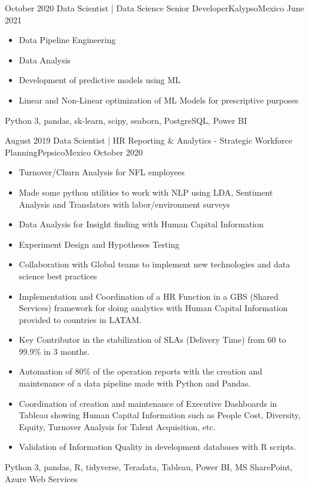 \begin{experiences}
  \experience
    {October 2020} {Data Scientist | Data Science Senior Developer}{Kalypso}{Mexico}
    {June 2021}    {
                      \begin{itemize}
                        \item Data Pipeline Engineering
                        \item Data Analysis
                        \item Development of predictive models using ML
                        \item Linear and Non-Linear optimization of ML Models for prescriptive purposes
                      \end{itemize}
                    }
                    {Python 3, pandas, sk-learn, scipy, seaborn, PostgreSQL, Power BI}
  \emptySeparator
  
  \experience
    {August 2019}     {Data Scientist | HR Reporting \& Analytics - Strategic Workforce Planning}{Pepsico}{Mexico}
    {October 2020}    {
                      \begin{itemize}
                        \item Turnover/Churn Analysis for NFL employees
                        \item Made some python utilities to work with NLP using LDA, Sentiment Analysis and Translators with labor/environment surveys                
                        \item Data Analysis for Insight finding with Human Capital Information                   
                        \item Experiment Design and Hypotheses Testing                         
                        \item Collaboration with Global teams to implement new technologies and data science best practices                                                      
                        \item Implementation and Coordination of a HR Function in a GBS (Shared Services) framework for doing analytics with
                        Human Capital Information provided to countries in LATAM.
                        \item Key Contributor in the stabilization of SLAs (Delivery Time) from 60 to 99.9\% in 3 months.
                        \item Automation of 80\% of the operation reports with the creation and maintenance of a data pipeline made with Python and Pandas.
                        \item  Coordination of creation and maintenance of Executive Dashboards in Tableau showing Human Capital Information
                        such as People Cost, Diversity, Equity, Turnover Analysis for Talent Acquisition, etc.
                        \item Validation of Information Quality in development databases with R scripts.
                      \end{itemize}
                    }
                    {Python 3, pandas, R, tidyverse, Teradata, Tableau, Power BI, MS SharePoint, Azure Web Services}
  \emptySeparator
  

\end{experiences}
